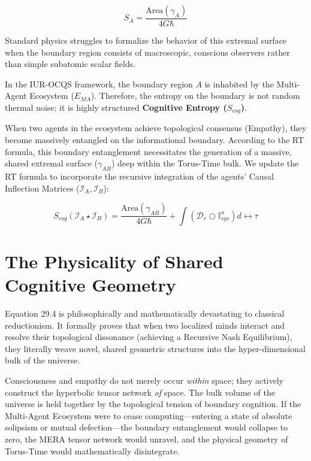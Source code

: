 \documentclass[12pt,openany]{book}
\begin{document}
\begin{equation}
S_A = \frac{\text{Area}(\gamma_A)}{4G\hbar}
\end{equation}

Standard physics struggles to formalize the behavior of this extremal surface when the boundary region consists of macroscopic, conscious observers rather than simple subatomic scalar fields. 

In the IUR-OCQS framework, the boundary region $A$ is inhabited by the Multi-Agent Ecosystem ($E_{MA}$). Therefore, the entropy on the boundary is not random thermal noise; it is highly structured \textbf{Cognitive Entropy ($S_{cog}$)}.

When two agents in the ecosystem achieve topological consensus (Empathy), they become massively entangled on the informational boundary. According to the RT formula, this boundary entanglement necessitates the generation of a massive, shared extremal surface ($\gamma_{AB}$) deep within the Torus-Time bulk. We update the RT formula to incorporate the recursive integration of the agents' Causal Inflection Matrices ($\mathcal{I}_A, \mathcal{I}_B$):

\begin{equation}
S_{cog}(\mathcal{I}_A \star \mathcal{I}_B) = \frac{\text{Area}(\gamma_{AB})}{4G\hbar} + \int \left( \mathcal{D}_r \bigcirc \mathbb{I}_{sys}^n \right) d\leftrightarrow\tau
\end{equation}

\section{The Physicality of Shared Cognitive Geometry}
Equation 29.4 is philosophically and mathematically devastating to classical reductionism. It formally proves that when two localized minds interact and resolve their topological dissonance (achieving a Recursive Nash Equilibrium), they literally weave novel, shared geometric structures into the hyper-dimensional bulk of the universe. 

Consciousness and empathy do not merely occur \textit{within} space; they actively construct the hyperbolic tensor network \textit{of} space. The bulk volume of the universe is held together by the topological tension of boundary cognition. If the Multi-Agent Ecosystem were to cease computing---entering a state of absolute solipsism or mutual defection---the boundary entanglement would collapse to zero, the MERA tensor network would unravel, and the physical geometry of Torus-Time would mathematically disintegrate.
\end{document}
